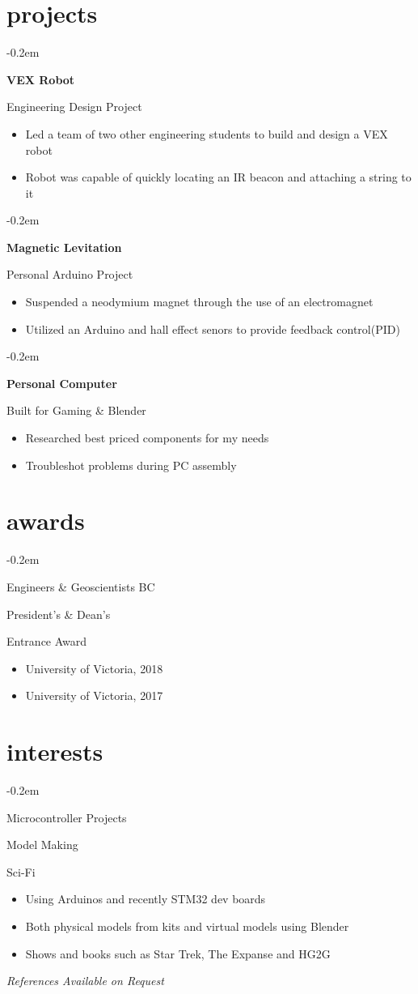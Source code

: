 \documentclass{article}
\newcommand{\ritem}[1]{
\item\hfill {#1}
}
\newcommand{\fancybullet}[2]{
{ {


\parbox[t]{5.5cm}{
\begin{minipage}[t]{5.5cm}
   \begin{list}{\quad}{}
   \itemsep-0.2em 
     #1
   \end{list}
\end{minipage}
}  
\parbox[t]{13cm}{
\begin{minipage}[t]{13cm}
   \begin{itemize}
   \itemsep-0.2em 
     #2
   \end{itemize}
\end{minipage}
}}\newline}
}
\begin{document}
\section{projects}
\fancybullet{
\ritem{\bfseries{VEX Robot}}
\ritem{Engineering Design Project}
}
{
\item Led a team of two other engineering students to build and design a VEX robot
\item Robot was capable of quickly locating an IR beacon and attaching a string to it
}
\vspace{0.3em}
\fancybullet{
\ritem{\bfseries{Magnetic Levitation}}
\ritem{Personal Arduino Project}
}
{
\item Suspended a neodymium magnet through the use of an electromagnet  
\item Utilized an Arduino and hall effect senors to provide feedback control(PID) 
}
\vspace{0.3em}

\vspace{0.3em}
\fancybullet{
\ritem{\bfseries{Personal Computer}}
\ritem{Built for Gaming \& Blender}
}
{
\item Researched best priced components for my needs
\item Troubleshot problems during PC assembly
}


\section{awards}

\fancybullet{
\ritem{Engineers \& Geoscientists BC}
\ritem{President's \& Dean's}
\ritem{Entrance Award}
}
{
\item University of Victoria, 2018
\item University of Victoria, 2017
}


\section{interests}

\fancybullet{
\ritem{Microcontroller Projects}
\ritem{Model Making}
\ritem{Sci-Fi}
}
{
\item Using Arduinos and recently STM32 dev boards
\item Both physical models from kits and virtual models using Blender
\item Shows and books such as Star Trek, The Expanse and HG2G
}
\vfill
\textit{References Available on Request}
\end{document}
